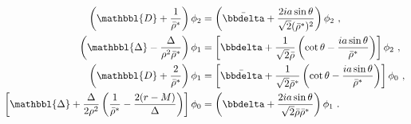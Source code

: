 \begin{subequations}
    \begin{align}
        \label{eq3:phi21phi14Expand}
        \left( \mathbbl{D} + \frac{1}{\bar{\rho}^*} \right) \phi_2 &= \left( \bar{\bbdelta} + \frac{2 i a \sin\theta}{\sqrt{2} (\bar{\rho}^*)^2} \right) \phi_2 ~,\\
        \label{eq3:phi12phi23Expand}
        \left( \mathbbl{\Delta} - \frac{\Delta}{\rho^2 \bar{\rho}^*} \right) \phi_1 &= \left[ \bbdelta + \frac{1}{\sqrt{2} \bar{\rho}} \left( \cot\theta - \frac{i a \sin\theta}{\bar{\rho}^*} \right) \right] \phi_2 ~,\\
        \label{eq3:phi11phi04Expand}
        \left( \mathbbl{D} + \frac{2}{\bar{\rho}^*} \right) \phi_1 &= \left[ \bar{\bbdelta} + \frac{1}{\sqrt{2} \bar{\rho}^*}\left( \cot\theta - \frac{i a \sin\theta}{\bar{\rho}^*} \right) \right] \phi_0 ~, \\
        \label{eq3:phi02phi13Expand}
        \left[ \mathbbl{\Delta} + \frac{\Delta}{2 \rho^2} \left( \frac{1}{\bar{\rho}^*} - \frac{2(r-M)}{\Delta} \right) \right] \phi_0 &= \left(\bbdelta + \frac{2 i a \sin\theta}{\sqrt{2} \bar{\rho} \bar{\rho}^*}\right) \phi_1  ~.
    \end{align}
    \label{eq3:phiAllExpand}
\end{subequations}

